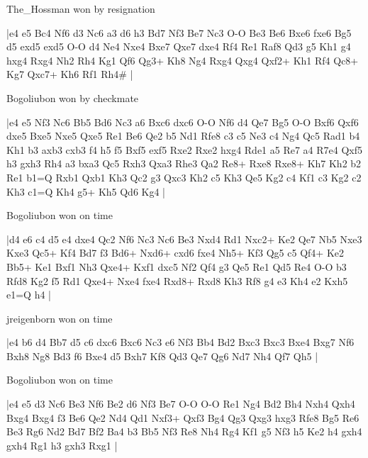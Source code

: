 \showboard

The\_Hossman won by resignation

\makegametitle
|e4 e5 Bc4 Nf6 d3 Nc6 a3 d6 h3 Bd7 Nf3 Be7 Nc3 O-O Be3 Be6 Bxe6 fxe6 Bg5 d5 exd5 exd5 O-O d4 Ne4 Nxe4 Bxe7 Qxe7 dxe4 Rf4 Re1 Raf8 Qd3 g5 Kh1 g4 hxg4 Rxg4 Nh2 Rh4 Kg1 Qf6 Qg3+ Kh8 Ng4 Rxg4 Qxg4 Qxf2+ Kh1 Rf4 Qc8+ Kg7 Qxc7+ Kh6 Rf1 Rh4\#  |

\showboard

Bogoliubon won by checkmate

\makegametitle
|e4 e5 Nf3 Nc6 Bb5 Bd6 Nc3 a6 Bxc6 dxc6 O-O Nf6 d4 Qe7 Bg5 O-O Bxf6 Qxf6 dxe5 Bxe5 Nxe5 Qxe5 Re1 Be6 Qe2 b5 Nd1 Rfe8 c3 c5 Ne3 c4 Ng4 Qc5 Rad1 b4 Kh1 b3 axb3 cxb3 f4 h5 f5 Bxf5 exf5 Rxe2 Rxe2 hxg4 Rde1 a5 Re7 a4 R7e4 Qxf5 h3 gxh3 Rh4 a3 bxa3 Qc5 Rxh3 Qxa3 Rhe3 Qa2 Re8+ Rxe8 Rxe8+ Kh7 Kh2 b2 Re1 b1=Q Rxb1 Qxb1 Kh3 Qc2 g3 Qxc3 Kh2 c5 Kh3 Qe5 Kg2 c4 Kf1 c3 Kg2 c2 Kh3 c1=Q Kh4 g5+ Kh5 Qd6 Kg4  |

\showboard

Bogoliubon won on time

\makegametitle
|d4 e6 c4 d5 e4 dxe4 Qc2 Nf6 Nc3 Nc6 Be3 Nxd4 Rd1 Nxc2+ Ke2 Qe7 Nb5 Nxe3 Kxe3 Qc5+ Kf4 Bd7 f3 Bd6+ Nxd6+ cxd6 fxe4 Nh5+ Kf3 Qg5 c5 Qf4+ Ke2 Bb5+ Ke1 Bxf1 Nh3 Qxe4+ Kxf1 dxc5 Nf2 Qf4 g3 Qe5 Re1 Qd5 Re4 O-O b3 Rfd8 Kg2 f5 Rd1 Qxe4+ Nxe4 fxe4 Rxd8+ Rxd8 Kh3 Rf8 g4 e3 Kh4 e2 Kxh5 e1=Q h4  |

\showboard

jreigenborn won on time

\makegametitle
|e4 b6 d4 Bb7 d5 c6 dxc6 Bxc6 Nc3 e6 Nf3 Bb4 Bd2 Bxc3 Bxc3 Bxe4 Bxg7 Nf6 Bxh8 Ng8 Bd3 f6 Bxe4 d5 Bxh7 Kf8 Qd3 Qe7 Qg6 Nd7 Nh4 Qf7 Qh5  |

\showboard

Bogoliubon won on time

\makegametitle
|e4 e5 d3 Nc6 Be3 Nf6 Be2 d6 Nf3 Be7 O-O O-O Re1 Ng4 Bd2 Bh4 Nxh4 Qxh4 Bxg4 Bxg4 f3 Be6 Qe2 Nd4 Qd1 Nxf3+ Qxf3 Bg4 Qg3 Qxg3 hxg3 Rfe8 Bg5 Re6 Be3 Rg6 Nd2 Bd7 Bf2 Ba4 b3 Bb5 Nf3 Re8 Nh4 Rg4 Kf1 g5 Nf3 h5 Ke2 h4 gxh4 gxh4 Rg1 h3 gxh3 Rxg1  |


